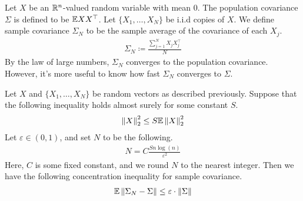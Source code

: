 \documentclass[11pt]{article}
\begin{document}
Let $X$ be an $\mathbb{R}^n$-valued random variable with mean $0$.
The population covariance $\Sigma$ is defined to be $\mathbb{E} X X^{\top}$.
Let $\{X_1, \ldots, X_N\}$ be i.i.d copies of $X$.
We define sample covariance $\Sigma_N$ to be the sample average of the covariance of each $X_j$.
\begin{align*}
  \Sigma_N \coloneqq \frac{\sum_{j=1}^N X_j X_j^{\top}}{N}
\end{align*}
By the law of large numbers, $\Sigma_N$ converges to the population covariance.
However, it's more useful to know how fast $\Sigma_N$ converges to $\Sigma$.
\begin{theorem}
  Let $X$ and $\{X_1, \ldots, X_N\}$ be random vectors as described previously.
  Suppose that the following inequality holds almost surely for some constant $S$.
  \begin{align*}
    \left\lVert X\right\rVert_2^2 \leq S \mathbb{E}\left\lVert X\right\rVert_2^2
  \end{align*}
  Let $\varepsilon \in (0,1)$, and set $N$ to be the following.
  \begin{align*}
    N = C \frac{S n \log(n)}{\varepsilon^2}
  \end{align*}
  Here, $C$ is some fixed constant, and we round $N$ to the nearest integer.
  Then we have the following concentration inequality for sample covariance.
  \begin{align*}
    \mathbb{E} \left\lVert\Sigma_N - \Sigma\right\rVert \leq \varepsilon \cdot \left\lVert\Sigma\right\rVert
  \end{align*}
\end{theorem}
\end{document}
